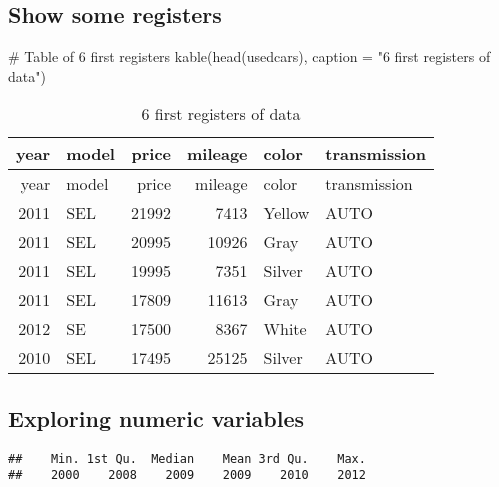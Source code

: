 \documentclass[
]{article}
\newenvironment{Shaded}{\begin{snugshade}}{\end{snugshade}}
\newcommand{\AttributeTok}[1]{\textcolor[rgb]{0.80,0.80,0.80}{#1}}
\newcommand{\CommentTok}[1]{\textcolor[rgb]{0.50,0.62,0.50}{#1}}
\newcommand{\DocumentationTok}[1]{\textcolor[rgb]{0.50,0.62,0.50}{#1}}
\newcommand{\FunctionTok}[1]{\textcolor[rgb]{0.94,0.94,0.56}{#1}}
\newcommand{\NormalTok}[1]{\textcolor[rgb]{0.80,0.80,0.80}{#1}}
\newcommand{\SpecialCharTok}[1]{\textcolor[rgb]{0.86,0.64,0.64}{#1}}
\newcommand{\StringTok}[1]{\textcolor[rgb]{0.80,0.58,0.58}{#1}}
\begin{document}
\hypertarget{show-some-registers}{%
\subsection{Show some registers}\label{show-some-registers}}

\begin{Shaded}
\begin{Highlighting}[]
\CommentTok{\# Table of 6 first registers}
\FunctionTok{kable}\NormalTok{(}\FunctionTok{head}\NormalTok{(usedcars), }\AttributeTok{caption =} \StringTok{"6 first registers of data"}\NormalTok{)}
\end{Highlighting}
\end{Shaded}

\begin{longtable}[]{@{}rlrrll@{}}
\caption{6 first registers of data}\tabularnewline
\toprule
year & model & price & mileage & color & transmission \\
\midrule
\endfirsthead
\toprule
year & model & price & mileage & color & transmission \\
\midrule
\endhead
2011 & SEL & 21992 & 7413 & Yellow & AUTO \\
2011 & SEL & 20995 & 10926 & Gray & AUTO \\
2011 & SEL & 19995 & 7351 & Silver & AUTO \\
2011 & SEL & 17809 & 11613 & Gray & AUTO \\
2012 & SE & 17500 & 8367 & White & AUTO \\
2010 & SEL & 17495 & 25125 & Silver & AUTO \\
\bottomrule
\end{longtable}

\hypertarget{exploring-numeric-variables}{%
\subsection{Exploring numeric
variables}\label{exploring-numeric-variables}}

\begin{Shaded}
\end{Shaded}

\begin{verbatim}
##    Min. 1st Qu.  Median    Mean 3rd Qu.    Max. 
##    2000    2008    2009    2009    2010    2012
\end{verbatim}
\end{document}
